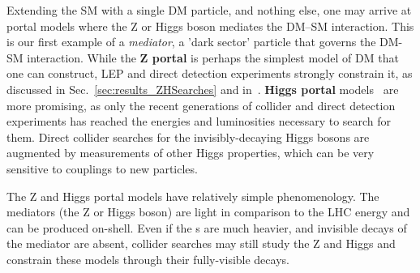 
Extending the SM with a single DM particle, and nothing else, one may arrive at portal models where the Z or Higgs boson mediates the DM--SM interaction.%
This is our first example of a {\it mediator}, a 'dark sector' particle that governs the DM-SM interaction.
While the \textbf{Z portal} is perhaps the simplest model of DM that one can construct, LEP and direct detection experiments strongly constrain it, as discussed in Sec.~\ref{sec:results_ZHSearches} and in~\cite{Escudero:2016gzx}. 
\textbf{Higgs portal} models~\cite{Patt:2006fw,Djouadi:2011aa} are more promising, as only the recent generations of collider and direct detection experiments has reached the energies and luminosities necessary to search for them.%
Direct collider searches for the invisibly-decaying Higgs bosons are augmented by measurements of other Higgs properties, which can be very sensitive to couplings to new particles.

The Z and Higgs portal models have relatively simple phenomenology.
The mediators (the Z or Higgs boson) are light in comparison to the LHC energy and can be produced on-shell.
Even if the {\IP}s are much heavier, and invisible decays of the mediator are absent, collider searches may still study the Z and Higgs and constrain these models through their fully-visible decays.




